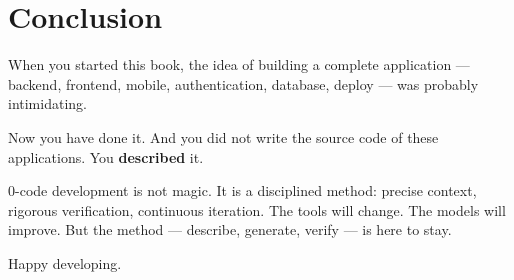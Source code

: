 \section*{Conclusion}

When you started this book, the idea of building a complete application --- backend, frontend, mobile, authentication, database, deploy --- was probably intimidating.

Now you have done it. And you did not write the source code of these applications. You \textbf{described} it.

0-code development is not magic. It is a disciplined method: precise context, rigorous verification, continuous iteration. The tools will change. The models will improve. But the method --- describe, generate, verify --- is here to stay.

Happy developing.
